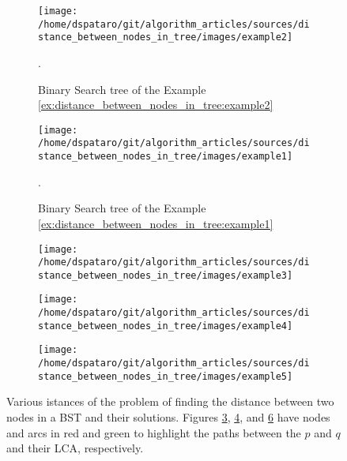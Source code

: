 \begin{figure}
	\centering
	\begin{subfigure}[b]{0.5\textwidth}
		\centering
		\texttt{[image: /home/dspataro/git/algorithm\_articles/sources/distance\_between\_nodes\_in\_tree/images/example2]}
		\caption{Binary Search tree of the Example
		\ref{ex:distance_between_nodes_in_tree:example2}}.
		\label{fig:distance_between_nodes_in_tree:example2}
	\end{subfigure}
	\hfill
	\begin{subfigure}[b]{0.3\textwidth}
		\centering
		\texttt{[image: /home/dspataro/git/algorithm\_articles/sources/distance\_between\_nodes\_in\_tree/images/example1]}
		\caption{Binary Search tree of the Example
		\ref{ex:distance_between_nodes_in_tree:example1}}.
		\label{fig:distance_between_nodes_in_tree:example1}
	\end{subfigure}
	\centering
	\begin{subfigure}[b]{0.3\textwidth}
		\centering
		\texttt{[image: /home/dspataro/git/algorithm\_articles/sources/distance\_between\_nodes\_in\_tree/images/example3]}
		\caption{}
		\label{fig:distance_between_nodes_in_tree:example3}
	\end{subfigure}
	\hfill
	\begin{subfigure}[b]{0.3\textwidth}
		\centering
		\texttt{[image: /home/dspataro/git/algorithm\_articles/sources/distance\_between\_nodes\_in\_tree/images/example4]}
		\caption{}
		\label{fig:distance_between_nodes_in_tree:example4}
	\end{subfigure}
	\hfill
	\begin{subfigure}[b]{0.3\textwidth}
		\centering
		\texttt{[image: /home/dspataro/git/algorithm\_articles/sources/distance\_between\_nodes\_in\_tree/images/example5]}
		\caption{}
		\label{fig:distance_between_nodes_in_tree:example5}
	\end{subfigure}
	\caption{Various istances of the problem of finding the distance between two nodes in a BST and
	their solutions. Figures \ref{fig:distance_between_nodes_in_tree:example3},
	\ref{fig:distance_between_nodes_in_tree:example4}, and
	\ref{fig:distance_between_nodes_in_tree:example5} have nodes and arcs in red and green to
	highlight the paths between the $p$ and $q$ and their LCA, respectively.}
\end{figure}



	



